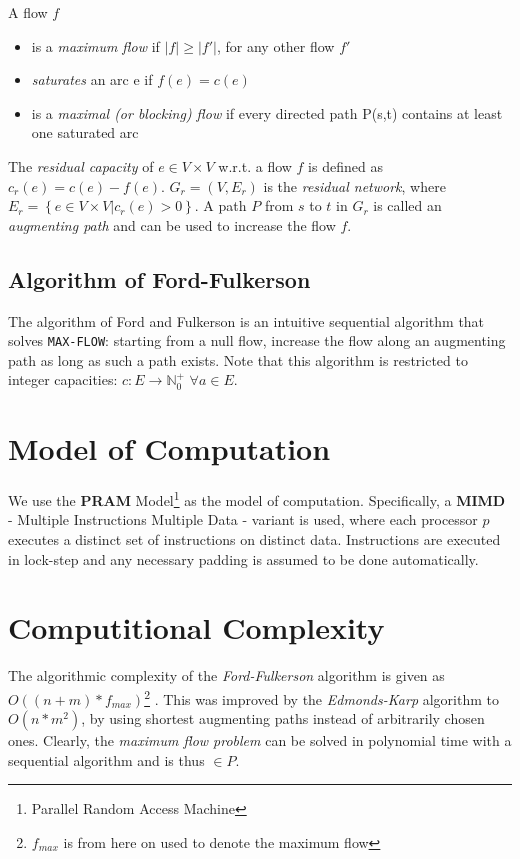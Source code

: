 \documentclass[a4paper,10pt, twocolumn]{article}
\begin{document}
A flow $f$
\begin{itemize}
	\item is a \emph{maximum flow} if $\lvert f\rvert \geq \lvert f'\rvert$, for any other flow $f'$
	\item \emph{saturates} an arc e if $f(e) = c(e)$
	\item is a \emph{maximal (or blocking) flow} if every directed path P(s,t) contains at least one saturated arc
\end{itemize}
\medskip
The \emph{residual capacity} of $e \in V \times V$ w.r.t. a flow $f$ is defined as $c_r(e) = c(e) - f(e)$. $G_r = (V, E_r)$ is the \emph{residual network}, where $E_r = \left\{e \in V \times V \lvert c_r(e) > 0\right\}$. A path $P$ from $s$ to $t$ in $G_r$ is called an \emph{augmenting path} and can be used to increase the flow $f$.

\subsection{Algorithm of Ford-Fulkerson}
\label{sec:fordfulkerson}
The algorithm of Ford and Fulkerson \cite{ahuja93} is an intuitive sequential algorithm that solves \lstinline|MAX-FLOW|: starting from a null flow, increase the flow along an augmenting path as long as such a path exists. Note that this algorithm is restricted to integer capacities:  $c:E\rightarrow \mathbb{N}_0^{+}$ $\forall a \in E$.

\section{Model of Computation}
\label{sec:model}
We use the \textbf{PRAM} Model\footnote{Parallel Random Access Machine} as the model of computation. Specifically, a \textbf{MIMD} - Multiple Instructions Multiple Data - variant is used, where each processor $p$ executes a distinct set of instructions on distinct data. Instructions are executed in lock-step and any necessary padding is assumed to be done automatically. 

\section{Computitional Complexity}
\label{sec:cc}
The algorithmic complexity of the \emph{Ford-Fulkerson} algorithm is given as $O((n+m)*f_{max})$\footnote{$f_{max}$ is from here on used to denote the maximum flow} \cite{ahuja93,papa95}. This was improved by the \emph{Edmonds-Karp} algorithm to $O(n*m^2)$, by using shortest augmenting paths instead of arbitrarily chosen ones. Clearly, the \emph{maximum flow problem} can be solved in polynomial time with a sequential algorithm and is thus $\in P$.
\end{document}

